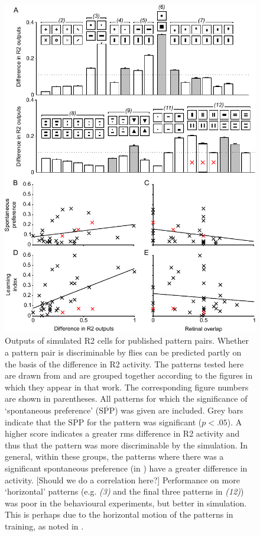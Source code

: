 \begin{figure}
\centering
\includegraphics{figures/pattern}
\caption{Outputs of simulated R2 cells for published pattern pairs. Whether a pattern pair is discriminable by flies can be predicted partly on the basis of the difference in R2 activity.
The patterns tested here are drawn from \protect\cite{Ernst1999} and are grouped together according to the figures in which they appear in that work.
The corresponding figure numbers are shown in parentheses.
All patterns for which the significance of `spontaneous preference' ($\overline{\mathrm{SPP}}$) was given are included.
Grey bars indicate that the $\overline{\mathrm{SPP}}$ for the pattern was significant ($p<.05$).
A higher score indicates a greater \ac{rms} difference in R2 activity and thus that the pattern was more discriminable by the simulation.
In general, within these groups, the patterns where there was a significant spontaneous preference (in \protect\cite{Ernst1999}) have a greater difference in activity.
[Should we do a correlation here?]
Performance on more `horizontal' patterns (e.g. \emph{(3)} and the final three patterns in \emph{(12)}) was poor in the behavioural experiments, but better in simulation.
This is perhaps due to the horizontal motion of the patterns in training, as noted in \protect\cite{Ernst1999}.
}
\label{fig:pattern}
\end{figure}
